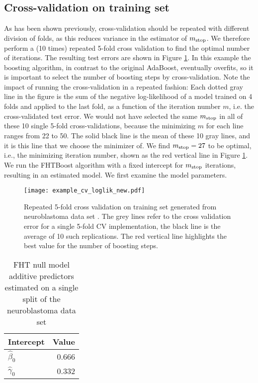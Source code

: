 \subsection{Cross-validation on training set}
As has been shown previously, cross-validation should be repeated with different division of folds, as this reduces variance in the estimator of $m_{\text{stop}}$.
We therefore perform a (10 times) repeated 5-fold cross validation to find the optimal number of iterations.
The resulting test errors are shown in Figure \ref{fig:neuroblastoma-cv}.
In this example the boosting algorithm, in contrast to the original AdaBoost, eventually overfits, so it is important to select the number of boosting steps by cross-validation.
Note the impact of running the cross-validation in a repeated fashion:
Each dotted gray line in the figure is the sum of the negative log-likelihood of a model trained on 4 folds and applied to the last fold, as a function of the iteration number $m$, i.e. the cross-validated test error.
We would not have selected the same $m_{\text{stop}}$ in all of these 10 single 5-fold cross-validations, because the minimizing $m$ for each line ranges from 22 to 50.
The solid black line is the mean of these 10 gray lines, and it is this line that we choose the minimizer of.
We find $m_{\text{stop}}=27$ to be optimal, i.e., the minimizing iteration number, shown as the red vertical line in Figure \ref{fig:neuroblastoma-cv}.
We run the FHTBoost algorithm with a fixed intercept for $m_{\text{stop}}$ iterations, resulting in an estimated model.
We first examine the model parameters.

\begin{figure}
\caption{
    Repeated 5-fold cross validation on training set generated from neuroblastoma data set \citep{oberthuer-data}.
    The grey lines refer to the cross validation error for a single 5-fold CV implementation,
    the black line is the average of 10 such replications.
    The red vertical line highlights the best value for the number of boosting steps.
}
\label{fig:neuroblastoma-cv}
\centering\texttt{[image: example\_cv\_loglik\_new.pdf]}
\end{figure}



\begin{table}
\caption{FHT null model additive predictors estimated on a single split of the neuroblastoma data set \citep{oberthuer-data}}
\label{tab:neuroblastoma-intercepts}
\centering
\begin{tabular}{lr}
\toprule
Intercept  & Value\\
\hline
$\hat{\beta}_0$  & 0.666 \\
$\hat{\gamma}_0$ & 0.332 \\
\bottomrule
\end{tabular}
\end{table}

